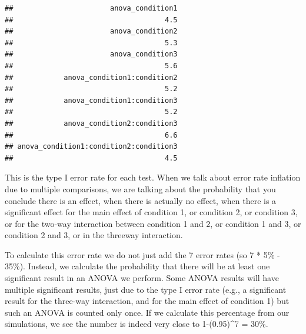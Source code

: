 \documentclass[]{book}
\newenvironment{Shaded}{\begin{snugshade}}{\end{snugshade}}
\newcommand{\ControlFlowTok}[1]{\textcolor[rgb]{0.13,0.29,0.53}{\textbf{#1}}}
\newcommand{\DecValTok}[1]{\textcolor[rgb]{0.00,0.00,0.81}{#1}}
\newcommand{\FloatTok}[1]{\textcolor[rgb]{0.00,0.00,0.81}{#1}}
\newcommand{\KeywordTok}[1]{\textcolor[rgb]{0.13,0.29,0.53}{\textbf{#1}}}
\newcommand{\NormalTok}[1]{#1}
\newcommand{\OperatorTok}[1]{\textcolor[rgb]{0.81,0.36,0.00}{\textbf{#1}}}
\newcommand{\StringTok}[1]{\textcolor[rgb]{0.31,0.60,0.02}{#1}}
\begin{document}
\begin{Shaded}
\end{Shaded}

\begin{verbatim}
##                       anova_condition1 
##                                    4.5 
##                       anova_condition2 
##                                    5.3 
##                       anova_condition3 
##                                    5.6 
##            anova_condition1:condition2 
##                                    5.2 
##            anova_condition1:condition3 
##                                    5.2 
##            anova_condition2:condition3 
##                                    6.6 
## anova_condition1:condition2:condition3 
##                                    4.5
\end{verbatim}

This is the type I error rate for each test. When we talk about error rate inflation due to multiple comparisons, we are talking about the probability that you conclude there is an effect, when there is actually no effect, when there is a significant effect for the main effect of condition 1, or condition 2, or condition 3, or for the two-way interaction between condition 1 and 2, or condition 1 and 3, or condition 2 and 3, or in the threeway interaction.

To calculate this error rate we do not just add the 7 error rates (so 7 * 5\% - 35\%). Instead, we calculate the probability that there will be at least one significant result in an ANOVA we perform. Some ANOVA results will have multiple significant results, just due to the type I error rate (e.g., a significant result for the three-way interaction, and for the main effect of condition 1) but such an ANOVA is counted only once. If we calculate this percentage from our simulations, we see the number is indeed very close to 1-(0.95)\^{}7 = 30\%.
\end{document}
